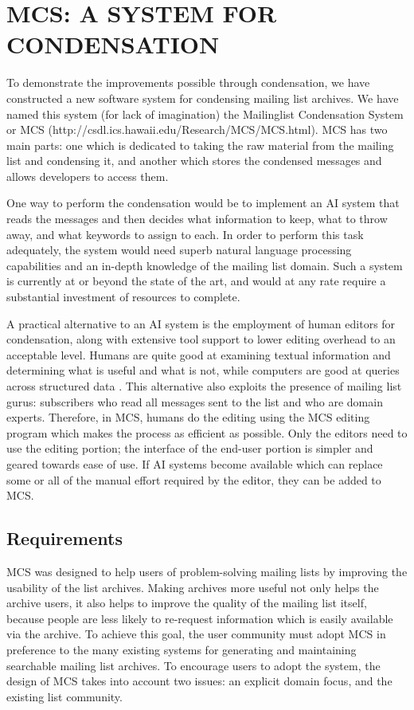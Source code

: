 \section{MCS: A SYSTEM FOR CONDENSATION}
\label{sec:mcs-system}
To demonstrate the improvements possible through condensation, we have
constructed a new software system for condensing mailing list archives. We have
named this system (for lack of imagination) the Mailinglist Condensation
System or MCS (http://csdl.ics.hawaii.edu/\linebreak[0]Research/MCS/MCS.html).
MCS has two main parts: one which is dedicated to taking the raw material from
the mailing list and condensing it, and another which stores the condensed
messages and allows developers to access them.

One way to perform the condensation would be to implement an AI system that
reads the messages and then decides what information to keep, what to throw
away, and what keywords to assign to each. In order to perform this task
adequately, the system would need superb natural language processing
capabilities and an in-depth knowledge of the mailing list domain. Such a
system is currently at or beyond the state of the art, and would at any rate
require a substantial investment of resources to complete.

A practical alternative to an AI system is the employment of human editors for
condensation, along with extensive tool support to lower editing overhead to an
acceptable level. Humans are quite good at examining textual information and
determining what is useful and what is not, while computers are good at queries
across structured data \cite{Brooks:1996:CST}. This alternative also exploits
the presence of mailing list gurus: subscribers who read all messages sent to
the list and who are domain experts. Therefore, in MCS, humans do the editing
using the MCS editing program which makes the process as efficient as possible.
Only the editors need to use the editing portion; the interface of the end-user
portion is simpler and geared towards ease of use. If AI systems become
available which can replace some or all of the manual effort required by the
editor, they can be added to MCS.

\subsection{Requirements}
MCS was designed to help users of problem-solving mailing lists by improving
the usability of the list archives. Making archives more useful not only helps
the archive users, it also helps to improve the quality of the mailing list
itself, because people are less likely to re-request information which is
easily available via the archive. To achieve this goal, the user community must
adopt MCS in preference to the many existing systems for generating and
maintaining searchable mailing list archives. To encourage users to adopt the
system, the design of MCS takes into account two issues: an explicit domain
focus, and the existing list community.

